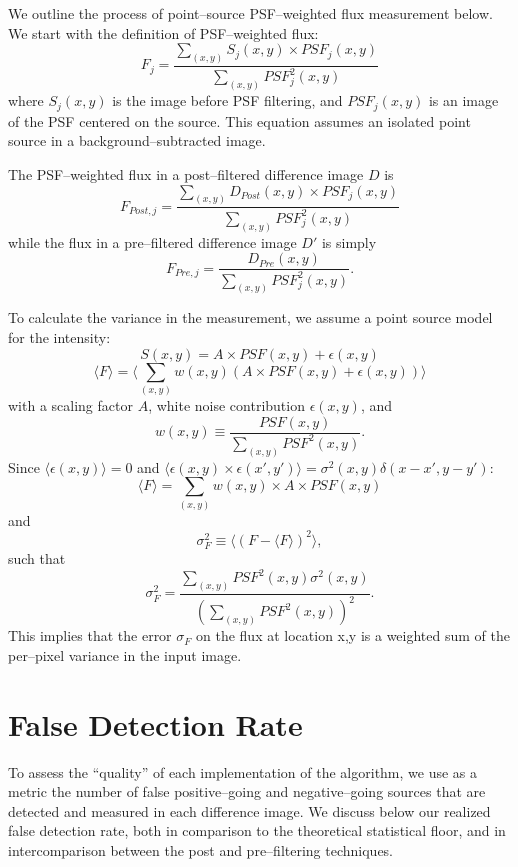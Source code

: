 \documentclass[floatfix, apj]{emulateapj}
\begin{document}
We outline the process of point--source PSF--weighted flux measurement below.
We start with the definition of PSF--weighted flux:
%
\[F_j = \frac{\sum_{(x,y)}S_j(x,y) \times PSF_j(x,y)}{\sum_{(x,y)}PSF_j^2(x,y)}\]
%
where $S_j(x,y)$ is the image before PSF filtering, and $PSF_j(x,y)$ is an image of the PSF centered on the source.
This equation assumes an isolated point source in a background--subtracted image.

The PSF--weighted flux in a post--filtered difference image $D$ is 
%
\[F_{Post,j} = \frac{\sum_{(x,y)}D_{Post}(x,y) \times PSF_j(x,y)}{\sum_{(x,y)}PSF_j^2(x,y)}\]
while the flux in a pre--filtered difference image $D'$ is simply
\[F_{Pre,j} = \frac{D_{Pre}(x,y)}{\sum_{(x,y)}PSF_j^2(x,y)}.\]

To calculate the variance in the measurement, we assume a point source model for the intensity:
%
\[S(x,y) = A \times PSF(x,y) + \epsilon(x,y)\]
\[\langle F \rangle = \langle \sum_{(x,y)} w(x,y)(A \times PSF(x,y) +\epsilon(x,y))\rangle\]
%
with a scaling factor $A$, white noise contribution $\epsilon(x,y)$, and
%
\[w(x,y) \equiv \frac{PSF(x,y)}{\sum_{(x,y)}PSF^2(x,y)}.\]
%
Since $\langle \epsilon(x,y) \rangle = 0$ and $\langle \epsilon(x,y) \times \epsilon(x',y') \rangle = \sigma^2(x,y)\delta(x-x', y-y')$:
%
\[\langle F \rangle = \sum_{(x,y)} w(x,y) \times A \times PSF(x,y)\]
and
\[\sigma^2_F \equiv \langle(F - \langle F \rangle)^2\rangle,\]
such that
\[\sigma^2_F = \frac{\sum_{(x,y)}PSF^2(x,y)\sigma^2(x,y)}{(\sum_{(x,y)} PSF^2(x,y))^2}.\]
This implies that the error $\sigma_{F}$ on the flux at location x,y is a weighted sum of the per--pixel variance in the input image.


\section{False Detection Rate}

To assess the ``quality'' of each implementation of the algorithm, we use as a metric the number of false positive--going and negative--going sources that are detected and measured in each difference image.  
We discuss below our realized false detection rate, both in comparison to the theoretical statistical floor, and in intercomparison between the post and pre--filtering techniques.
\end{document}
